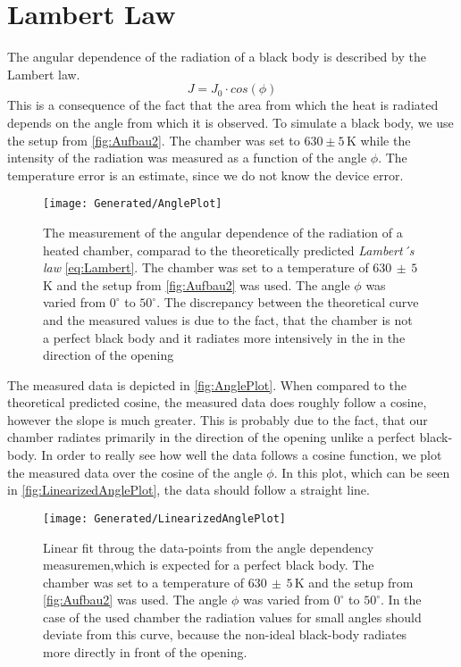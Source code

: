 \documentclass[a4paper,10pt,twocolumn]{article}
\begin{document}
    \section{Lambert Law}\label{sec:lambertLaw}
    The angular dependence of the radiation of a black body is described by the Lambert law.
    \begin{equation}\label{eq:Lambert}
        J = J_0 \cdot cos(\phi)
    \end{equation}
    This is a consequence of the fact that the area from which the heat is radiated depends on the angle from which it is observed.
    To simulate a black body, we use the setup from \autoref{fig:Aufbau2}.
    The chamber was set to $630 \pm 5\,$K while the intensity of the radiation was measured as a function of the angle $\phi$.
    The temperature error is an estimate, since we do not know the device error.
    \begin{figure}
        \begin{center}
            \texttt{[image: Generated/AnglePlot]}
            \caption{The measurement of the angular dependence of the radiation of a heated chamber, comparad to the theoretically predicted \textit{Lambert´s law} \autoref{eq:Lambert}.
            The chamber was set to a temperature of $630\, \pm \,5\,$K and the setup from \autoref{fig:Aufbau2} was used.
            The angle $\phi$ was varied from $0^\circ$ to $50^\circ $.
            The discrepancy between the theoretical curve and the measured values is due to the fact, that the chamber is not a perfect black body and it radiates more intensively in the in the direction of the opening}
            \label{fig:AnglePlot}
        \end{center}
    \end{figure}
    The measured data is depicted in \autoref{fig:AnglePlot}.
    When compared to the theoretical predicted cosine, the measured data does roughly follow a cosine, however the slope is much greater.
    This is probably due to the fact, that our chamber radiates primarily in the direction of the opening unlike a perfect black-body.
    In order to really see how well the data follows a cosine function, we plot the measured data over the cosine of the angle $\phi$.
    In this plot, which can be seen in \autoref{fig:LinearizedAnglePlot}, the data should follow a straight line.
    \begin{figure}
        \begin{center}
            \texttt{[image: Generated/LinearizedAnglePlot]}
            \caption{Linear fit throug the data-points from the angle dependency measuremen,which is expected for a perfect black body.
            The chamber was set to a temperature of $630\, \pm \,5\,$K and the setup from \autoref{fig:Aufbau2} was used.
            The angle $\phi$ was varied from $0^\circ$ to $50^\circ $.
            In the case of the used chamber the radiation values for small angles should deviate from this curve,
            because the non-ideal black-body radiates more directly in front of the opening.}
            \label{fig:LinearizedAnglePlot}
        \end{center}
    \end{figure}
\end{document}
